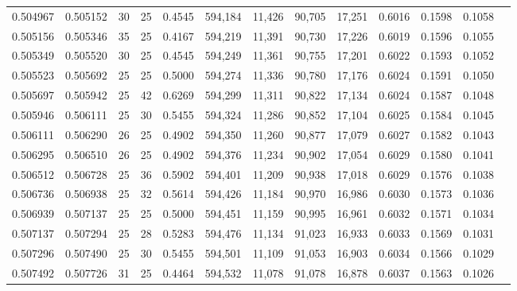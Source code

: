 \begin{tabular}{rrrrrrrrrrrrr}
0.504967 & 0.505152 &    30 &  25 &                                     0.4545 & 594,184 &  11,426 &  90,705 &  17,251 & 0.6016 & 0.1598 & 0.1058 \\
0.505156 & 0.505346 &    35 &  25 &                                     0.4167 & 594,219 &  11,391 &  90,730 &  17,226 & 0.6019 & 0.1596 & 0.1055 \\
0.505349 & 0.505520 &    30 &  25 &                                     0.4545 & 594,249 &  11,361 &  90,755 &  17,201 & 0.6022 & 0.1593 & 0.1052 \\
0.505523 & 0.505692 &    25 &  25 &                                     0.5000 & 594,274 &  11,336 &  90,780 &  17,176 & 0.6024 & 0.1591 & 0.1050 \\
0.505697 & 0.505942 &    25 &  42 &                                     0.6269 & 594,299 &  11,311 &  90,822 &  17,134 & 0.6024 & 0.1587 & 0.1048 \\
0.505946 & 0.506111 &    25 &  30 &                                     0.5455 & 594,324 &  11,286 &  90,852 &  17,104 & 0.6025 & 0.1584 & 0.1045 \\
0.506111 & 0.506290 &    26 &  25 &                                     0.4902 & 594,350 &  11,260 &  90,877 &  17,079 & 0.6027 & 0.1582 & 0.1043 \\
0.506295 & 0.506510 &    26 &  25 &                                     0.4902 & 594,376 &  11,234 &  90,902 &  17,054 & 0.6029 & 0.1580 & 0.1041 \\
0.506512 & 0.506728 &    25 &  36 &                                     0.5902 & 594,401 &  11,209 &  90,938 &  17,018 & 0.6029 & 0.1576 & 0.1038 \\
0.506736 & 0.506938 &    25 &  32 &                                     0.5614 & 594,426 &  11,184 &  90,970 &  16,986 & 0.6030 & 0.1573 & 0.1036 \\
0.506939 & 0.507137 &    25 &  25 &                                     0.5000 & 594,451 &  11,159 &  90,995 &  16,961 & 0.6032 & 0.1571 & 0.1034 \\
0.507137 & 0.507294 &    25 &  28 &                                     0.5283 & 594,476 &  11,134 &  91,023 &  16,933 & 0.6033 & 0.1569 & 0.1031 \\
0.507296 & 0.507490 &    25 &  30 &                                     0.5455 & 594,501 &  11,109 &  91,053 &  16,903 & 0.6034 & 0.1566 & 0.1029 \\
0.507492 & 0.507726 &    31 &  25 &                                     0.4464 & 594,532 &  11,078 &  91,078 &  16,878 & 0.6037 & 0.1563 & 0.1026 \\

\end{tabular}
